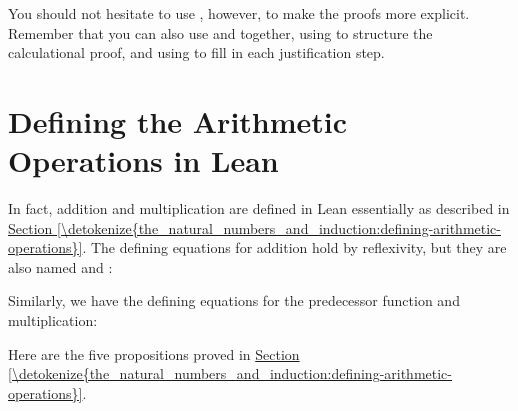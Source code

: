 \documentclass[letterpaper,10pt,english]{sphinxmanual}
\begin{document}
\sphinxAtStartPar
You should not hesitate to use ,
however, to make the proofs more explicit.
Remember that you can also use  and  together,
using  to structure the calculational proof,
and using  to fill in each justification step.


\section{Defining the Arithmetic Operations in Lean}
\label{\detokenize{the_natural_numbers_and_induction_in_lean:defining-the-arithmetic-operations-in-lean}}
\sphinxAtStartPar
In fact, addition and multiplication are defined in Lean essentially as described in \hyperref[\detokenize{the_natural_numbers_and_induction:defining-arithmetic-operations}]{Section \ref{\detokenize{the_natural_numbers_and_induction:defining-arithmetic-operations}}}. The defining equations for addition hold by reflexivity, but they are also named  and :

\begin{sphinxVerbatim}[commandchars=\\\{\}]
         
              
\end{sphinxVerbatim}

\sphinxAtStartPar
Similarly, we have the defining equations for the predecessor function
and multiplication:

\begin{sphinxVerbatim}[commandchars=\\\{\}]
 
 
 
 
\end{sphinxVerbatim}

\sphinxAtStartPar
Here are the five propositions proved in \hyperref[\detokenize{the_natural_numbers_and_induction:defining-arithmetic-operations}]{Section \ref{\detokenize{the_natural_numbers_and_induction:defining-arithmetic-operations}}}.
\end{document}
